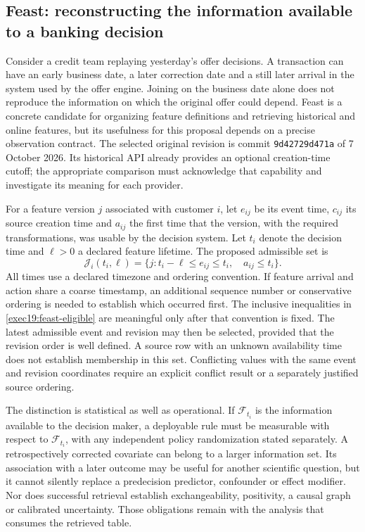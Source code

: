 \subsection{Feast: reconstructing the information available to a banking decision}
\label{exec19:feast-clock}

Consider a credit team replaying yesterday's offer decisions. A transaction
can have an early business date, a later correction date and a still later
arrival in the system used by the offer engine. Joining on the business date
alone does not reproduce the information on which the original offer could
depend. Feast is a concrete candidate for organizing feature definitions and
retrieving historical and online features, but its usefulness for this
proposal depends on a precise observation contract. The selected original
revision is commit \texttt{9d42729d471a} of 7 October 2026. Its historical API
already provides an optional creation-time cutoff; the appropriate comparison
must acknowledge that capability and investigate its meaning for each
provider.~\citep{exec19_feast_source}

For a feature version $j$ associated with customer $i$, let $e_{ij}$ be its
event time, $c_{ij}$ its source creation time and $a_{ij}$ the first time that
the version, with the required transformations, was usable by the decision
system. Let $t_i$ denote the decision time and $\ell>0$ a declared feature
lifetime. The proposed admissible set is
\begin{equation}
 \mathcal J_i(t_i,\ell)=
 \{j:t_i-\ell\leq e_{ij}\leq t_i,\quad a_{ij}\leq t_i\}.
 \label{exec19:feast-eligible}
\end{equation}
All times use a declared timezone and ordering convention. If feature arrival
and action share a coarse timestamp, an additional sequence number or
conservative ordering is needed to establish which occurred first. The
inclusive inequalities in \eqref{exec19:feast-eligible} are meaningful only
after that convention is fixed. The latest admissible event and revision may
then be selected, provided that the revision order is well defined. A source
row with an unknown availability time does not establish membership in this
set. Conflicting values with the same event and revision coordinates require
an explicit conflict result or a separately justified source ordering.

The distinction is statistical as well as operational. If $\mathcal F_{t_i}$
is the information available to the decision maker, a deployable rule must
be measurable with respect to $\mathcal F_{t_i}$, with any independent policy
randomization stated separately. A retrospectively corrected covariate can
belong to a larger information set. Its association with a later outcome may
be useful for another scientific question, but it cannot silently replace a
predecision predictor, confounder or effect modifier. Nor does successful
retrieval establish exchangeability, positivity, a causal graph or calibrated
uncertainty. Those obligations remain with the analysis that consumes the
retrieved table.

